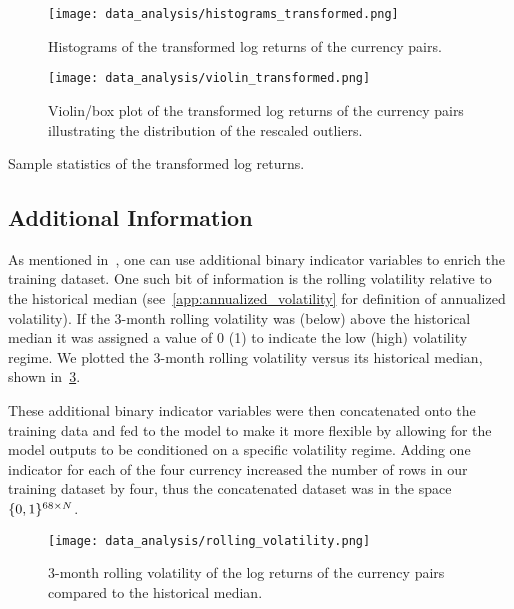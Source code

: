 \begin{figure}[!htb]
    \begin{center}
        \texttt{[image: data\_analysis/histograms\_transformed.png]}
    \end{center}
    \caption{Histograms of the transformed log returns of the currency pairs.}
    \label{fig:histograms_transformed}
\end{figure}
\begin{figure}[!htb]
    \begin{center}
        \texttt{[image: data\_analysis/violin\_transformed.png]}
    \end{center}
    \caption{Violin/box plot of the transformed log returns of the currency pairs illustrating the distribution of the rescaled outliers.}
    \label{fig:violin_transformed}
\end{figure}
\begin{table}[!htb]
    \centering
    \begin{adjustbox}{max width=\textwidth}
        
    \end{adjustbox}
    \caption{Sample statistics of the transformed log returns.}
    \label{tbl:data_log_returns_transformed_stats}
\end{table}

\subsection{Additional Information}
As mentioned in~\cite{kondratyev_2019}, one can use additional binary indicator variables to enrich the training dataset.
One such bit of information is the rolling volatility relative to the historical median (see~\cref{app:annualized_volatility} for definition of annualized volatility).
If the 3-month rolling volatility was (below) above the historical median it was assigned a value of 0 (1) to indicate the low (high) volatility regime.
We plotted the 3-month rolling volatility versus its historical median, shown in~\cref{fig:rolling_volatility}.

These additional binary indicator variables were then concatenated onto the training data and fed to the model to make it more flexible by allowing for the model outputs to be conditioned on a specific volatility regime.
Adding one indicator for each of the four currency increased the number of rows in our training dataset by four, thus the concatenated dataset was in the space \( \{0,1\}^{68 \times N} \).

\begin{figure}[!htb]
    \begin{center}
        \texttt{[image: data\_analysis/rolling\_volatility.png]}
    \end{center}
    \caption{3-month rolling volatility of the log returns of the currency pairs compared to the historical median.}
    \label{fig:rolling_volatility}
\end{figure}
